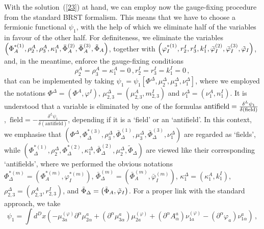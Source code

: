 \documentclass[a4paper,10pt]{article}
\begin{document}
With the solution~(\ref{23}) at hand, we can employ now the gauge-fixing
procedure from the standard BRST formalism. This means that we have to
choose a fermionic functional $\psi _{1}$, with the help of which we
eliminate half of the variables in favour of the other half. For
definiteness, we eliminate the variables
$\left( \Phi _{A}^{*(1)},\rho _{2}^{A},\rho
_{3}^{A},\kappa _{1}^{A},\bar{\Phi}_{A}^{(2)},\bar{\Phi}_{A}^{(3)},\tilde{%
\Phi}_{A}\right) $, together with $\left( \varphi
_{I}^{*(1)},r_{2}^{I},r_{3}^{I},k_{1}^{I},\bar{\varphi}_{I}^{(2)},\bar{%
\varphi}_{I}^{(3)},\tilde{\varphi}_{I}\right) $, and, in the meantime,
enforce the gauge-fixing conditions 
\begin{equation}
\label{sp3.134}
\rho _{2}^{A}=\rho _{3}^{A}=\kappa
_{1}^{A}=0\,, r_{2}^{I}=r_{3}^{I}=k_{1}^{I}=0\,,
\end{equation}
that can be implemented by taking $\psi _{1}=\psi _{1}\left[ \Phi ^{\Delta
},\mu _{2}^{\Delta },\mu _{3}^{\Delta },\nu _{1}^{\Delta }\right] $, where
we employed the notations $\Phi ^{\Delta }=\left( \Phi ^{A},\varphi
^{I}\right) $, $\mu _{2,3}^{\Delta }=\left( \mu
_{2,3}^{A},m_{2,3}^{I}\right) $ and $\nu _{1}^{\Delta }=\left( \nu
_{1}^{A},n_{1}^{I}\right) $. It is understood that a variable is eliminated
by one of the formulas $\mathrm{antifield}=\frac{\delta ^{L}\psi _{1}}{%
\delta \left( \mathrm{field}\right) }$,\ $\mathrm{field}=-\frac{\delta
^{L}\psi _{1}}{\delta \left( \mathrm{antifield}\right) }$, depending if it
is a `field' or an `antifield'. In this context, we emphasise that $\left(
\Phi ^{\Delta },\Phi _{\Delta }^{*(3)},\rho _{3}^{\Delta },\bar{\Phi}%
_{\Delta }^{(1)},\mu _{3}^{\Delta },\bar{\Phi}_{\Delta }^{(3)},\nu
_{1}^{\Delta }\right) $ are regarded as `fields', while $\left( \Phi
_{\Delta }^{*(1)},\rho _{2}^{\Delta },\Phi _{\Delta }^{*(2)},\kappa
_{1}^{\Delta },\bar{\Phi}_{\Delta }^{(2)},\mu _{2}^{\Delta },\tilde{\Phi}%
_{\Delta }\right) $ are viewed like their corresponding `antifields', where
we performed the obvious notations $\Phi _{\Delta }^{*(m)}=\left( \Phi
_{A}^{*(m)},\varphi _{I}^{*(m)}\right) $, $\bar{\Phi}_{\Delta }^{(m)}=\left( 
\bar{\Phi}_{A}^{(m)},\bar{\varphi}_{I}^{(m)}\right) $, $\kappa _{1}^{\Delta
}=\left( \kappa _{1}^{A},k_{1}^{I}\right) $, $\rho _{2,3}^{\Delta }=\left(
\rho _{2,3}^{A},r_{2,3}^{I}\right) $, and
$\tilde{\Phi}_{\Delta }=\left( \tilde{%
\Phi}_{A},\tilde{\varphi}_{I}\right) $. For a proper link with the
standard approach, we take 
\begin{equation}
\label{sp3.135}
\psi _{1}=\int d^{D}x\left( -\mu _{3a}^{(\varphi )}\partial ^{\alpha }\mu
_{2\alpha }^{a}+\left( \partial ^{\alpha }\mu _{3\alpha }^{a}\right) \mu
_{2a}^{(\varphi )}+\left( \partial ^{\alpha }A_{\alpha }^{a}\right) \nu
_{1a}^{(\varphi )}-\left( \partial ^{\alpha }\varphi _{a}\right) \nu
_{1\alpha }^{a}\right) \,,
\end{equation}
\end{document}
